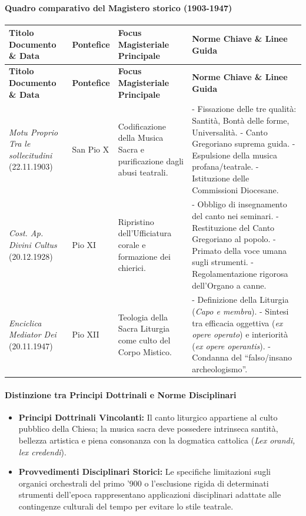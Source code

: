 \documentclass[12pt,a4paper]{article}
\begin{document}
	\paragraph{Quadro comparativo del Magistero storico (1903-1947)}\label{quadro-comparativo-del-magistero-storico-1903-1947}
	
	\begin{longtable}{L{3.5cm}L{2.5cm}L{4cm}L{5cm}}
		\toprule
		\textbf{Titolo Documento \& Data} & \textbf{Pontefice} & \textbf{Focus Magisteriale Principale} & \textbf{Norme Chiave \& Linee Guida} \\
		\midrule
		\endfirsthead
		\toprule
		\textbf{Titolo Documento \& Data} & \textbf{Pontefice} & \textbf{Focus Magisteriale Principale} & \textbf{Norme Chiave \& Linee Guida} \\
		\midrule
		\endhead
		\bottomrule
		\endlastfoot
		\emph{Motu Proprio Tra le sollecitudini} (22.11.1903) & San Pio X & Codificazione della Musica Sacra e purificazione dagli abusi teatrali. & - Fissazione delle tre qualità: Santità, Bontà delle forme, Universalità. - Canto Gregoriano suprema guida. - Espulsione della musica profana/teatrale. - Istituzione delle Commissioni Diocesane. \\
		\emph{Cost. Ap. Divini Cultus} (20.12.1928) & Pio XI & Ripristino dell'Ufficiatura corale e formazione dei chierici. & - Obbligo di insegnamento del canto nei seminari. - Restituzione del Canto Gregoriano al popolo. - Primato della voce umana sugli strumenti. - Regolamentazione rigorosa dell'Organo a canne. \\
		\emph{Enciclica Mediator Dei} (20.11.1947) & Pio XII & Teologia della Sacra Liturgia come culto del Corpo Mistico. & - Definizione della Liturgia (\emph{Capo e membra}). - Sintesi tra efficacia oggettiva (\emph{ex opere operato}) e interiorità (\emph{ex opere operantis}). - Condanna del ``falso/insano archeologismo''. \\
	\end{longtable}
	
	\paragraph{Distinzione tra Principi Dottrinali e Norme Disciplinari}\label{distinzione-tra-principi-dottrinali-e-norme-disciplinari}
	
	\begin{itemize}[leftmargin=*]
		\item \textbf{Principi Dottrinali Vincolanti:} Il canto liturgico appartiene al culto pubblico della Chiesa; la musica sacra deve possedere intrinseca santità, bellezza artistica e piena consonanza con la dogmatica cattolica (\emph{Lex orandi, lex credendi}).
		\item \textbf{Provvedimenti Disciplinari Storici:} Le specifiche limitazioni sugli organici orchestrali del primo '900 o l'esclusione rigida di determinati strumenti dell'epoca rappresentano applicazioni disciplinari adattate alle contingenze culturali del tempo per evitare lo stile teatrale.
	\end{itemize}
	
\end{document}
